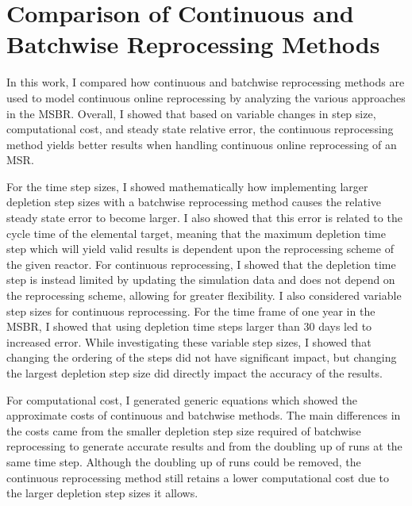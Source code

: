 \renewcommand*\descriptionlabel[1]{\hspace\leftmargin$#1$}
\setcounter{tocdepth}{5}
\setcounter{secnumdepth}{5}



\section{Comparison of Continuous and Batchwise Reprocessing Methods}

In this work, I compared how continuous and batchwise reprocessing methods are used to model continuous online reprocessing by analyzing the various approaches in the MSBR.
Overall, I showed that based on variable changes in step size, computational cost, and steady state relative error, the continuous reprocessing method yields better results when handling continuous online reprocessing of an MSR.

For the time step sizes, I showed mathematically how implementing larger depletion step sizes with a batchwise reprocessing method causes the relative steady state error to become larger.
I also showed that this error is related to the cycle time of the elemental target, meaning that the maximum depletion time step which will yield valid results is dependent upon the reprocessing scheme of the given reactor.
For continuous reprocessing, I showed that the depletion time step is instead limited by updating the simulation data and does not depend on the reprocessing scheme, allowing for greater flexibility.
I also considered variable step sizes for continuous reprocessing.
For the time frame of one year in the MSBR, I showed that using depletion time steps larger than 30 days led to increased error.
While investigating these variable step sizes, I showed that changing the ordering of the steps did not have significant impact, but changing the largest depletion step size did directly impact the accuracy of the results.

For computational cost, I generated generic equations which showed the approximate costs of continuous and batchwise methods. The main differences in the costs came from the smaller depletion step size required of batchwise reprocessing to generate accurate results and from the doubling up of runs at the same time step.
Although the doubling up of runs could be removed, the continuous reprocessing method still retains a lower computational cost due to the larger depletion step sizes it allows.

